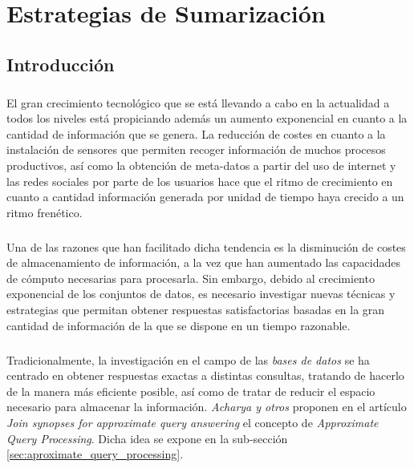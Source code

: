 \documentclass{subfiles}
\begin{document}
  \chapter{Estrategias de Sumarización}
  \label{chap:summaries}

    \section{Introducción}
    \label{sec:summaries_intro}

      \paragraph{}
      El gran crecimiento tecnológico que se está llevando a cabo en la actualidad a todos los niveles está propiciando además un aumento exponencial en cuanto a la cantidad de información que se genera. La reducción de costes en cuanto a la instalación de sensores que permiten recoger información de muchos procesos productivos, así como la obtención de meta-datos a partir del uso de internet y las redes sociales por parte de los usuarios hace que el ritmo de crecimiento en cuanto a cantidad información generada por unidad de tiempo haya crecido a un ritmo frenético.

      \paragraph{}
      Una de las razones que han facilitado dicha tendencia es la disminución de costes de almacenamiento de información, a la vez que han aumentado las capacidades de cómputo necesarias para procesarla. Sin embargo, debido al crecimiento exponencial de los conjuntos de datos, es necesario investigar nuevas técnicas y estrategias que permitan obtener respuestas satisfactorias basadas en la gran cantidad de información de la que se dispone en un tiempo razonable.

      \paragraph{}
      Tradicionalmente, la investigación en el campo de las \emph{bases de datos} se ha centrado en obtener respuestas exactas a distintas consultas, tratando de hacerlo de la manera más eficiente posible, así como de tratar de reducir el espacio necesario para almacenar la información. \emph{Acharya y otros} proponen en el artículo \emph{Join synopses for approximate query answering} \cite{acharya1999join} el concepto de \emph{Approximate Query Processing}. Dicha idea se expone en la sub-sección \ref{sec:aproximate_query_processing}.
\end{document}
